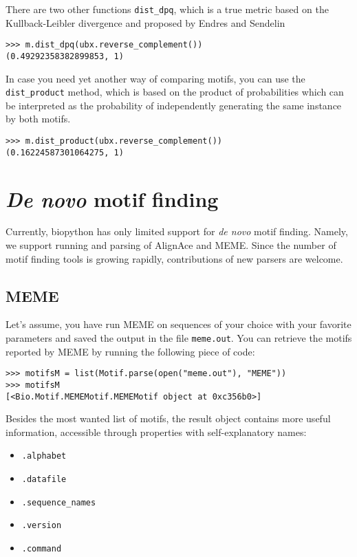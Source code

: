\documentclass{article}
\begin{document}
There are two other functions \verb|dist_dpq|, which is a true metric based on the Kullback-Leibler divergence and proposed by Endres and Sendelin \cite{Endres2003}
\begin{verbatim}
>>> m.dist_dpq(ubx.reverse_complement())
(0.49292358382899853, 1)
\end{verbatim}

In case you need yet another way of comparing motifs, you can use the
\verb|dist_product| method, which is based on the product of
probabilities which can be interpreted as the probability of
independently generating the same instance by both motifs.

\begin{verbatim}
>>> m.dist_product(ubx.reverse_complement())
(0.16224587301064275, 1)
\end{verbatim}

\section{\emph{De novo} motif finding}
\label{sec:find}

Currently, biopython has only limited support for \emph{de novo} motif
finding. Namely, we support running and parsing of AlignAce \cite{Hughes2000} and
MEME\cite{Bailey1994}. Since the number of motif finding tools is growing rapidly, 
contributions of new parsers are welcome. 

\subsection{MEME}
\label{sec:meme}

Let's assume, you have run MEME on sequences of your choice with your
favorite parameters and saved the output in the file
\verb|meme.out|. You can retrieve the motifs reported by MEME by
running the following piece of code:

\begin{verbatim}
>>> motifsM = list(Motif.parse(open("meme.out"), "MEME"))
>>> motifsM
[<Bio.Motif.MEMEMotif.MEMEMotif object at 0xc356b0>]
\end{verbatim}

Besides the most wanted list of motifs, the result object contains more useful information, accessible through properties with self-explanatory names:
\begin{itemize}
\item \verb|.alphabet|
\item \verb|.datafile|
\item \verb|.sequence_names|
\item \verb|.version|
\item \verb|.command|
\end{itemize}
\end{document}
